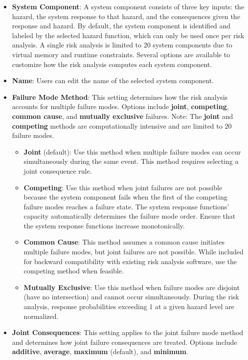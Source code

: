 \documentclass[
]{book}
\begin{document}
\begin{itemize}
\item
  \textbf{System Component}: A system component consists of three key inputs: the hazard, the system response to that hazard, and the consequences given the response and hazard. By default, the system component is identified and labeled by the selected hazard function, which can only be used once per risk analysis. A single risk analysis is limited to 20 system components due to virtual memory and runtime constraints. Several options are available to customize how the risk analysis computes each system component.
\item
  \textbf{Name}: Users can edit the name of the selected system component.
\item
  \textbf{Failure Mode Method}: This setting determines how the risk analysis accounts for multiple failure modes. Options include \textbf{joint}, \textbf{competing}, \textbf{common cause}, and \textbf{mutually exclusive} failures. Note: The \textbf{joint} and \textbf{competing} methods are computationally intensive and are limited to 20 failure modes.

  \begin{itemize}
  \item
    \textbf{Joint} (default): Use this method when multiple failure modes can occur simultaneously during the same event. This method requires selecting a joint consequence rule.
  \item
    \textbf{Competing}: Use this method when joint failures are not possible because the system component fails when the first of the competing failure modes reaches a failure state. The system response functions' capacity automatically determines the failure mode order. Ensure that the system response functions increase monotonically.
  \item
    \textbf{Common Cause}: This method assumes a common cause initiates multiple failure modes, but joint failures are not possible. While included for backward compatibility with existing risk analysis software, use the competing method when feasible.
  \item
    \textbf{Mutually Exclusive}: Use this method when failure modes are disjoint (have no intersection) and cannot occur simultaneously. During the risk analysis, response probabilities exceeding 1 at a given hazard level are normalized.
  \end{itemize}
\item
  \textbf{Joint Consequences}: This setting applies to the joint failure mode method and determines how joint failure consequences are treated. Options include \textbf{additive}, \textbf{average}, \textbf{maximum} (default), and \textbf{minimum}.


\end{itemize}
\end{document}
